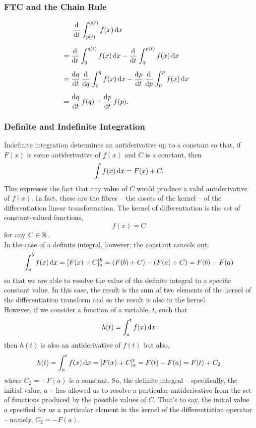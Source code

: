 \documentclass[../MathsNotesBase.tex]{subfiles}
\begin{document}
{		\biggerskip
		\subsubsection{FTC and the Chain Rule}
		\begin{align*}
			&\hspace{14pt} \dod{}{t} \int_{p(t)}^{q(t)} f(x) \dif x \nn
			&= \dod{}{t} \int_0^{q(t)} f(x) \dif x - \dod{}{t} \int_0^{p(t)} f(x) \dif x &\sidecomment{} \nn
			&= \dod{q}{t} \dod{}{q} \int_0^{q} f(x) \dif x - \dod{p}{t} \dod{}{p} \int_0^{p} f(x) \dif x &\sidecomment{} \nn
			&= \dod{q}{t} f(q) - \dod{p}{t} f(p).
		\end{align*}
		
		\bigskip
		\subsubsection{Definite and Indefinite Integration}\label{ssection:definite-and-indefinite-integration}
		Indefinite integration determines an antiderivative up to a constant so that, if $F(x)$ is some antiderivative of $f(x)$ and $C$ is a constant, then
		\[ \int f(x) \dif x = F(x) + C. \]
		This expresses the fact that any value of $C$ would produce a valid antiderivative of $f(x)$. In fact, these are the fibres -- the cosets of the kernel -- of the differentiation linear transformation. The kernel of differentiation is the set of constant-valued functions,
		\[ f(x) = C \]
		for any ${ C \in \mathbb{R}^{} }$.\\
		
		In the case of a definite integral, however, the constant cancels out:
		\[ \int_a^b f(x) \dif x = [F(x) + C]_a^b = (F(b) + C) - (F(a) + C) = F(b) - F(a) \]
		so that we are able to resolve the value of the definite integral to a specific constant value. In this case, the result is the sum of two elements of the kernel of the differentiation transform and so the result is also in the kernel.\\
		
		However, if we consider a function of a variable, $t$, such that
		\[ h(t) = \int_a^t f(x) \dif x \]
		then $h(t)$ is also an antiderivative of $f(t)$ but also,
		\[ h(t) = \int_a^t f(x) \dif x = [F(x) + C]_a^t = F(t) - F(a) = F(t) + C_2 \]
		where ${ C_2 = -F(a) }$ is a constant. So, the definite integral -- specifically, the initial value, $a$ -- has allowed us to resolve a particular antiderivative from the set of functions produced by the possible values of $C$. That's to say, the initial value $a$ specified for us a particular element in the kernel of the differentiation operator -- namely, ${ C_2 = -F(a) }$.\\
		
}
\end{document}
